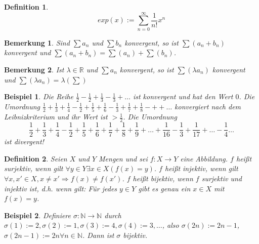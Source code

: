 \documentclass[a4paper,10pt]{article}
\newtheorem{definition}{Definition}
\newtheorem{notice}{Bemerkung}
\newtheorem{example}{Beispiel}
\begin{document}
\begin{definition}
 \begin{equation*}
  exp(x) := \sum_{n = 0}^\infty \frac{1}{n!} x^n
 \end{equation*}
\end{definition}

\begin{notice}
 Sind $\sum a_n$ und $\sum b_n$ konvergent, so ist $\sum (a_n + b_n)$ konvergent und $\sum (a_n + b_n) = \sum (a_n) + \sum (b_n)$.
\end{notice}

\begin{notice}
 Ist $\lambda \in \mathbb{R}$ und $\sum a_n$ konvergent, so ist $\sum (\lambda a_n)$ konvergent und $\sum (\lambda a_n) = \lambda (\sum)$
\end{notice}

\begin{example}
 Die Reihe $\frac{1}{2} - \frac{1}{2} + \frac{1}{3} - \frac{1}{3} + \dots$ ist konvergent und hat den Wert $0$.
 Die Umordnung $\frac{1}{2} + \frac{1}{3} + \frac{1}{4} - \frac{1}{2} + \frac{1}{5} + \frac{1}{6} - \frac{1}{3} + \frac{1}{7} + \frac{1}{8} -++ \dots$ konvergiert nach dem Leibnizkriterium und ihr Wert ist $> \frac{1}{2}$.
 Die Umordnung 
 \begin{equation*}
  \frac{1}{2} + \frac{1}{3} + \frac{1}{4} - \frac{1}{2} + \frac{1}{5} + \frac{1}{6} + \frac{1}{7} + \frac{1}{8} + \frac{1}{9} + \dots + \frac{1}{16} - \frac{1}{3} + \frac{1}{17} + \dots - \frac{1}{4} \dots
 \end{equation*}
 ist divergent!
\end{example}

\begin{definition}
 Seien $X$ und $Y$ Mengen und sei $f: X \rightarrow Y$ eine Abbildung.
 $f$ heißt surjektiv, wenn gilt $\forall y \in Y \exists x \in X (f(x) = y)$.
 $f$ heißt injektiv, wenn gilt $\forall x, x' \in X, x \ne x' \Rightarrow f(x) \ne f(x')$.
 $f$ heißt bijektiv, wenn $f$ surjektiv und injektiv ist, d.h. wenn gilt: Für jedes $y \in Y$ gibt es genau ein $x \in X$ mit $f(x) = y$.
\end{definition}

\begin{example}
 Definiere $\sigma: \mathbb{N} \rightarrow \mathbb{N}$ durch $\sigma(1) := 2, \sigma(2) := 1, \sigma(3) := 4, \sigma(4) := 3, \dots$, also $\sigma(2n) := 2n - 1$, $\sigma(2n - 1) := 2n \forall n \in \mathbb{N}$. Dann ist $\sigma$ bijektiv.
\end{example}
\end{document}
